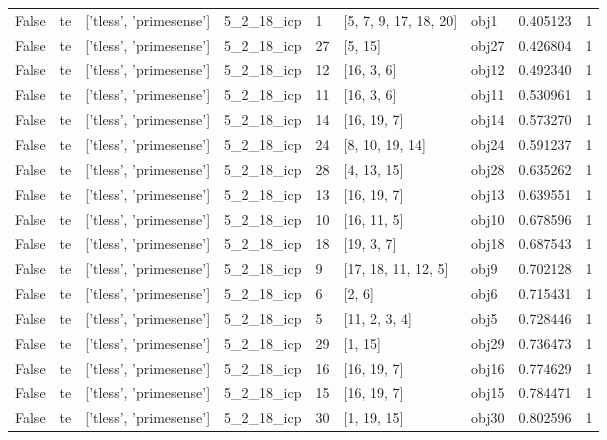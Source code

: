 \documentclass[a4paper,table]{article}
\begin{document}
\begin{adjustbox}{max width=\textwidth}
\begin{tabular}{lllllllrl}
   False &         te &  ['tless', 'primesense'] &  5\_2\_18\_icp &        1 &  [5, 7, 9, 17, 18, 20] &     obj1 &     0.405123 &   1 \\
   False &         te &  ['tless', 'primesense'] &  5\_2\_18\_icp &       27 &                [5, 15] &    obj27 &     0.426804 &   1 \\
   False &         te &  ['tless', 'primesense'] &  5\_2\_18\_icp &       12 &             [16, 3, 6] &    obj12 &     0.492340 &   1 \\
   False &         te &  ['tless', 'primesense'] &  5\_2\_18\_icp &       11 &             [16, 3, 6] &    obj11 &     0.530961 &   1 \\
   False &         te &  ['tless', 'primesense'] &  5\_2\_18\_icp &       14 &            [16, 19, 7] &    obj14 &     0.573270 &   1 \\
   False &         te &  ['tless', 'primesense'] &  5\_2\_18\_icp &       24 &        [8, 10, 19, 14] &    obj24 &     0.591237 &   1 \\
   False &         te &  ['tless', 'primesense'] &  5\_2\_18\_icp &       28 &            [4, 13, 15] &    obj28 &     0.635262 &   1 \\
   False &         te &  ['tless', 'primesense'] &  5\_2\_18\_icp &       13 &            [16, 19, 7] &    obj13 &     0.639551 &   1 \\
   False &         te &  ['tless', 'primesense'] &  5\_2\_18\_icp &       10 &            [16, 11, 5] &    obj10 &     0.678596 &   1 \\
   False &         te &  ['tless', 'primesense'] &  5\_2\_18\_icp &       18 &             [19, 3, 7] &    obj18 &     0.687543 &   1 \\
   False &         te &  ['tless', 'primesense'] &  5\_2\_18\_icp &        9 &    [17, 18, 11, 12, 5] &     obj9 &     0.702128 &   1 \\
   False &         te &  ['tless', 'primesense'] &  5\_2\_18\_icp &        6 &                 [2, 6] &     obj6 &     0.715431 &   1 \\
   False &         te &  ['tless', 'primesense'] &  5\_2\_18\_icp &        5 &          [11, 2, 3, 4] &     obj5 &     0.728446 &   1 \\
   False &         te &  ['tless', 'primesense'] &  5\_2\_18\_icp &       29 &                [1, 15] &    obj29 &     0.736473 &   1 \\
   False &         te &  ['tless', 'primesense'] &  5\_2\_18\_icp &       16 &            [16, 19, 7] &    obj16 &     0.774629 &   1 \\
   False &         te &  ['tless', 'primesense'] &  5\_2\_18\_icp &       15 &            [16, 19, 7] &    obj15 &     0.784471 &   1 \\
   False &         te &  ['tless', 'primesense'] &  5\_2\_18\_icp &       30 &            [1, 19, 15] &    obj30 &     0.802596 &   1 \\
\bottomrule
\end{tabular}
\end{adjustbox}
\end{document}
